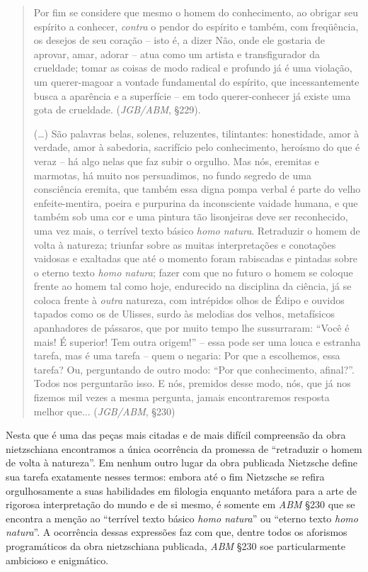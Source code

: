 \documentclass[
	12pt,				%
	openright,			%
	oneside,			%
	a4paper,			%
	english,			%
	french,				%
	spanish,			%
	brazil				%
	]{abntex2}
\begin{document}
\begin{quotation}
Por fim se considere que mesmo o homem do conhecimento, ao obrigar seu espírito a conhecer, \textit{contra} o pendor do espírito e também, com freqüência, os desejos de seu coração – isto é, a dizer Não, onde ele gostaria de aprovar, amar, adorar – atua como um artista e transfigurador da crueldade; tomar as coisas de modo radical e profundo já é uma violação, um querer-magoar a vontade fundamental do espírito, que incessantemente busca a aparência e a superfície – em todo querer-conhecer já existe uma gota de crueldade. (\textit{JGB/ABM}, §229).

(…) São palavras belas, solenes, reluzentes, tilintantes: honestidade, amor à verdade, amor à sabedoria, sacrifício pelo conhecimento, heroísmo do que é veraz – há algo nelas que faz subir o orgulho. Mas nós, eremitas e marmotas, há muito nos persuadimos, no fundo segredo de uma consciência eremita, que também essa digna pompa verbal é parte do velho enfeite-mentira, poeira e purpurina da inconsciente vaidade humana, e que também sob uma cor e uma pintura tão lisonjeiras deve ser reconhecido, uma vez mais, o terrível texto básico \textit{homo natura}. Retraduzir o homem de volta à natureza; triunfar sobre as muitas interpretações e conotações vaidosas e exaltadas que até o momento foram rabiscadas e pintadas sobre o eterno texto \textit{homo natura}; fazer com que no futuro o homem se coloque frente ao homem tal como hoje, endurecido na disciplina da ciência, já se coloca frente à \textit{outra} natureza, com intrépidos olhos de Édipo e ouvidos tapados como os de Ulisses, surdo às melodias dos velhos, metafísicos apanhadores de pássaros, que por muito tempo lhe sussurraram: “Você é mais! É superior! Tem outra origem!” – essa pode ser uma louca e estranha tarefa, mas é uma tarefa – quem o negaria: Por que a escolhemos, essa tarefa? Ou, perguntando de outro modo: “Por que conhecimento, afinal?”. Todos nos perguntarão isso. E nós, premidos desse modo, nós, que já nos fizemos mil vezes a mesma pergunta, jamais encontraremos resposta melhor que... (\textit{JGB/ABM}, §230)
\end{quotation}

Nesta que é uma das peças mais citadas e de mais difícil compreensão da obra nietzschiana encontramos a única ocorrência da promessa de “retraduzir o homem de volta à natureza”. Em nenhum outro lugar da obra publicada Nietzsche define sua tarefa exatamente nesses termos: embora até o fim Nietzsche se refira orgulhosamente a suas habilidades em filologia enquanto metáfora para a arte de rigorosa interpretação do mundo e de si mesmo, é somente em \textit{ABM} §230 que se encontra a menção ao “terrível texto básico \textit{homo natura}” ou “eterno texto \textit{homo natura}”. A ocorrência dessas expressões faz com que, dentre todos os aforismos programáticos da obra nietzschiana publicada, \textit{ABM} §230 soe particularmente ambicioso e enigmático. 
	
\end{document}
